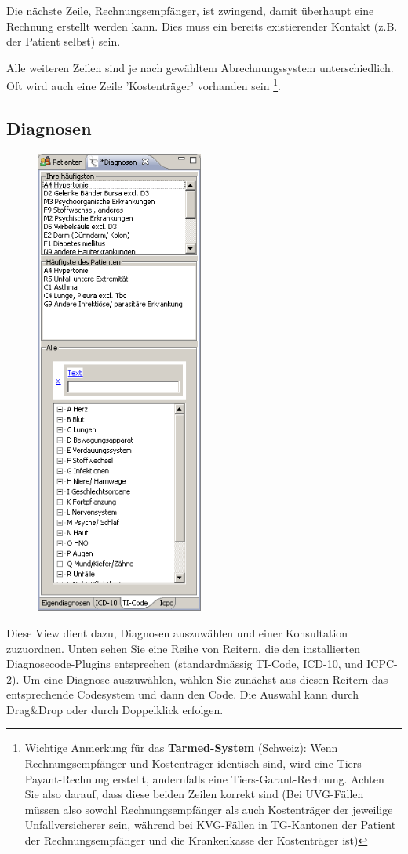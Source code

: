 Die nächste Zeile, Rechnungsempfänger, ist zwingend, damit überhaupt eine Rechnung erstellt werden kann. Dies muss ein bereits existierender Kontakt (z.B. der Patient selbst) sein.

\medskip
Alle weiteren Zeilen sind je nach gewähltem Abrechnungssystem unterschiedlich. Oft wird auch eine Zeile 'Kostenträger' vorhanden sein \footnote{Wichtige Anmerkung für das \textbf{Tarmed-System} (Schweiz): Wenn Rechnungsempfänger und Kostenträger identisch sind, wird eine Tiers Payant-Rechnung erstellt, andernfalls eine Tiers-Garant-Rechnung. Achten Sie also darauf, dass diese beiden Zeilen korrekt sind (Bei UVG-Fällen müssen also sowohl Rechnungsempfänger als auch Kostenträger der jeweilige Unfallversicherer sein, während bei KVG-Fällen in TG-Kantonen der Patient der Rechnungsempfänger und die Krankenkasse der Kostenträger ist)}.


\subsection{Diagnosen}
\label{view:diagnosen} 
\begin{figure}
    \includegraphics[width=5.5cm]{images/diagnosenview}
    \label{fig:diagnosen}
\end{figure}
Diese View dient dazu, Diagnosen auszuwählen und einer Konsultation zuzuordnen. Unten sehen Sie eine Reihe von Reitern, die den installierten Diagnosecode-Plugins entsprechen (standardmässig TI-Code, ICD-10, und ICPC-2). Um eine Diagnose auszuwählen, wählen Sie zunächst aus diesen Reitern das entsprechende Codesystem und dann den Code. Die Auswahl kann durch Drag\&Drop oder durch Doppelklick erfolgen.


